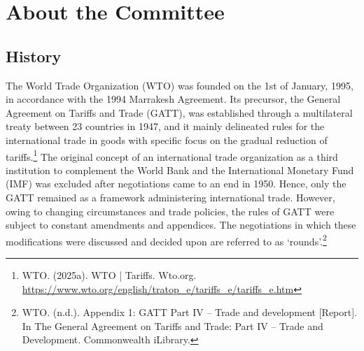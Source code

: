 \section{About the Committee}

\subsection{History}

The World Trade Organization (WTO) was founded on the 1st of January, 1995, in accordance with the 1994 Marrakesh Agreement. Its precursor, the General Agreement on Tariffs and Trade (GATT), was established through a multilateral treaty between 23 countries in 1947, and it mainly delineated rules for the international trade in goods with specific focus on the gradual reduction of tariffs.\footnote{WTO. (2025a). WTO | Tariffs. Wto.org. \url{https://www.wto.org/english/tratop_e/tariffs_e/tariffs_e.htm}} The original concept of an international trade organization as a third institution to complement the World Bank and the International Monetary Fund (IMF) was excluded after negotiations came to an end in 1950. Hence, only the GATT remained as a framework administering international trade. However, owing to changing circumstances and trade policies, the rules of GATT were subject to constant amendments and appendices. The negotiations in which these modifications were discussed and decided upon are referred to as ‘rounds’.\footnote{WTO. (n.d.). Appendix 1: GATT Part IV – Trade and development [Report]. In The General Agreement on Tariffs and Trade: Part IV – Trade and Development. Commonwealth iLibrary.}


